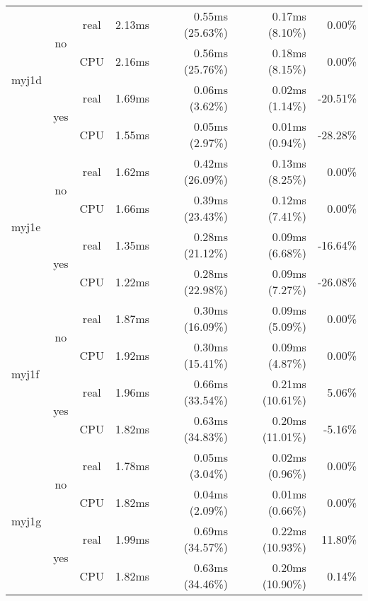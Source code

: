 \documentclass[en]{pracamgr}
\begin{document}
\begin{small}
\begin{longtable}{|l|c|c|r|r|r|r|}
\hline
\multirow{4}{*}{myj1d}    & \multirow{2}{*}{no}  & real & 2.13ms & 0.55ms (25.63\%) & 0.17ms (8.10\%) & 0.00\% \\*
                          &                      & CPU  & 2.16ms & 0.56ms (25.76\%) & 0.18ms (8.15\%) & 0.00\% \\*
                          \cline{2-7}
                          & \multirow{2}{*}{yes} & real & 1.69ms & 0.06ms (3.62\%) & 0.02ms (1.14\%) & -20.51\% \\*
                          &                      & CPU  & 1.55ms & 0.05ms (2.97\%) & 0.01ms (0.94\%) & -28.28\% \\
\hline
\multirow{4}{*}{myj1e}    & \multirow{2}{*}{no}  & real & 1.62ms & 0.42ms (26.09\%) & 0.13ms (8.25\%) & 0.00\% \\*
                          &                      & CPU  & 1.66ms & 0.39ms (23.43\%) & 0.12ms (7.41\%) & 0.00\% \\*
                          \cline{2-7}
                          & \multirow{2}{*}{yes} & real & 1.35ms & 0.28ms (21.12\%) & 0.09ms (6.68\%) & -16.64\% \\*
                          &                      & CPU  & 1.22ms & 0.28ms (22.98\%) & 0.09ms (7.27\%) & -26.08\% \\
\hline
\multirow{4}{*}{myj1f}    & \multirow{2}{*}{no}  & real & 1.87ms & 0.30ms (16.09\%) & 0.09ms (5.09\%) & 0.00\% \\*
                          &                      & CPU  & 1.92ms & 0.30ms (15.41\%) & 0.09ms (4.87\%) & 0.00\% \\*
                          \cline{2-7}
                          & \multirow{2}{*}{yes} & real & 1.96ms & 0.66ms (33.54\%) & 0.21ms (10.61\%) & 5.06\% \\*
                          &                      & CPU  & 1.82ms & 0.63ms (34.83\%) & 0.20ms (11.01\%) & -5.16\% \\
\hline
\multirow{4}{*}{myj1g}    & \multirow{2}{*}{no}  & real & 1.78ms & 0.05ms (3.04\%) & 0.02ms (0.96\%) & 0.00\% \\*
                          &                      & CPU  & 1.82ms & 0.04ms (2.09\%) & 0.01ms (0.66\%) & 0.00\% \\*
                          \cline{2-7}
                          & \multirow{2}{*}{yes} & real & 1.99ms & 0.69ms (34.57\%) & 0.22ms (10.93\%) & 11.80\% \\*
                          &                      & CPU  & 1.82ms & 0.63ms (34.46\%) & 0.20ms (10.90\%) & 0.14\% \\

\end{longtable}
\end{small}
\end{document}
